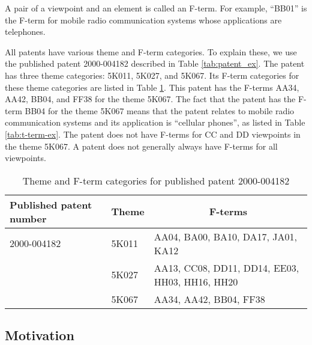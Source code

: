 \documentclass[english]{jnlp_1.2c}
\begin{document}
A pair of a viewpoint and an element is called an F-term.
For example, ``BB01'' is the F-term for mobile radio communication systems
whose applications are telephones.

All patents have various theme and F-term categories. 
To explain these, 
we use the published patent 2000-004182 described in Table \ref{tab:patent_ex}. 
The patent has three theme categories: 5K011, 5K027, and 5K067. 
Its F-term categories 
for these theme categories
are listed in Table \ref{tab:theme_fterm_ex}.
This patent has the F-terms AA34, AA42, BB04, and FF38 for the theme 5K067.
The fact that the patent has the F-term BB04 for the theme 5K067
means that 
the patent relates to 
mobile radio communication systems 
and its application is ``cellular phones'', as listed in Table \ref{tab:t-term-ex}. 
The patent
does not have F-terms for CC and DD viewpoints in the theme 5K067.
A patent does not generally always have F-terms for all viewpoints.


\begin{table}[t]
\caption{Theme and F-term categories for published patent 2000-004182}
\label{tab:theme_fterm_ex}
\begin{center}
\begin{tabular}{|l|l|l|} \hline
Published patent number & Theme & \multicolumn{1}{c|}{F-terms} \\\hline
2000-004182 & 5K011 & AA04, BA00, BA10, DA17, JA01, KA12\\
& 5K027 & AA13, CC08, DD11, DD14, EE03, HH03, HH16, HH20\\
& 5K067 & AA34, AA42, BB04, FF38 \\\hline
\end{tabular}
\end{center}
\end{table}


\subsection{Motivation}
\label{sec:motivation}
\end{document}
